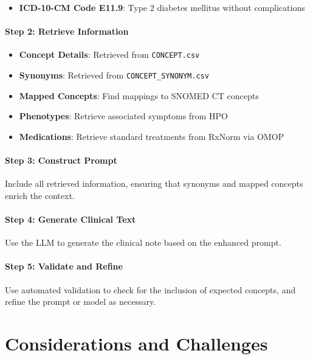 \documentclass[12pt, a4paper]{article}
\begin{document}
\begin{itemize}
    \item \textbf{ICD-10-CM Code E11.9}: Type 2 diabetes mellitus without complications
\end{itemize}

\paragraph{Step 2: Retrieve Information}

\begin{itemize}
    \item \textbf{Concept Details}: Retrieved from \texttt{CONCEPT.csv}
    \item \textbf{Synonyms}: Retrieved from \texttt{CONCEPT\_SYNONYM.csv}
    \item \textbf{Mapped Concepts}: Find mappings to SNOMED CT concepts
    \item \textbf{Phenotypes}: Retrieve associated symptoms from HPO
    \item \textbf{Medications}: Retrieve standard treatments from RxNorm via OMOP
\end{itemize}

\paragraph{Step 3: Construct Prompt}

Include all retrieved information, ensuring that synonyms and mapped concepts enrich the context.

\paragraph{Step 4: Generate Clinical Text}

Use the LLM to generate the clinical note based on the enhanced prompt.

\paragraph{Step 5: Validate and Refine}

Use automated validation to check for the inclusion of expected concepts, and refine the prompt or model as necessary.

\section{Considerations and Challenges}
\end{document}
